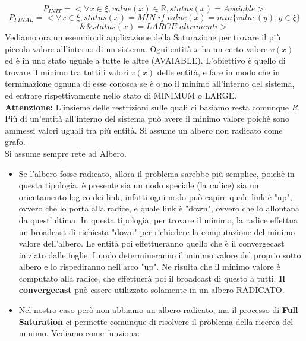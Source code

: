 $$P_{INIT} = < \forall x \in \xi, value(x) \in \mathbb{R}, status(x) =
    Avaiable>$$
$$
    P_{FINAL} =   <
    \forall x \in \xi, status(x)= MIN \; if \; value(x) = min
    \{value(y), y \in \xi \}$$$$ \&\&  status(x) = LARGE \;altrimenti >$$
Vediamo ora un esempio di applicazione della Saturazione per trovare il più
piccolo valore all'interno di un sistema. Ogni entità $x$ ha un certo valore
$v(x)$ ed è in uno stato uguale a tutte le altre (AVAIABLE). L'obiettivo è
quello di trovare il minimo tra tutti i valori $v(x)$ delle entità, e fare in
modo che in terminazione ognuna di esse conosca se è o no il minimo all'interno
del sistema, ed entrare rispettivamente nello stato di MINIMUM o LARGE.\\
\textbf{Attenzione:} L'insieme delle restrizioni sulle quali ci basiamo resta
comunque $R$. Più di un'entità all'interno del sistema può avere il minimo
valore poichè sono ammessi valori uguali tra più entità. Si assume un albero non
radicato come grafo.\\
Si assume sempre rete ad Albero.
\begin{itemize}
    \item Se l'albero fosse radicato, allora il problema sarebbe più semplice,
          poichè in questa tipologia, è presente sia un nodo speciale (la radice) sia un
          orientamento logico dei link, infatti ogni nodo può capire quale link è "up",
          ovvero che lo porta alla radice, e quale link è "down", ovvero che lo
          allontana da quest'ultima. In questa tipologia, per trovare il minimo, la
          radice effettua un broadcast di richiesta "down" per richiedere la
          computazione del minimo valore dell'albero. Le entità poi effettueranno quello
          che è il convergecast iniziato dalle foglie. I nodo determineranno il minimo
          valore del proprio sotto albero e lo rispediranno nell'arco "up". Ne risulta
          che il minimo valore è computato alla radice, che effettuerà poi il broadcast
          di questo a tutti. \textbf{Il convergecast} può essere utilizzato solamente in
          un albero RADICATO.
    \item Nel nostro caso però non abbiamo un albero radicato, ma il processo di
          \textbf{Full Saturation} ci permette comunque di risolvere il problema della
          ricerca del minimo. Vediamo come funziona:
\end{itemize}

